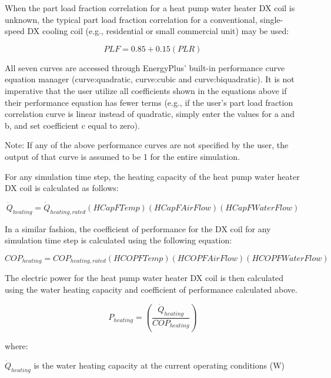 When the part load fraction correlation for a heat pump water heater DX coil is unknown, the typical part load fraction correlation for a conventional, single-speed DX cooling coil (e.g., residential or small commercial unit) may be used:

\begin{equation}
PLF = 0.85 + 0.15(PLR)
\end{equation}

All seven curves are accessed through EnergyPlus' built-in performance curve equation manager (curve:quadratic, curve:cubic and curve:biquadratic). It is not imperative that the user utilize all coefficients shown in the equations above if their performance equation has fewer terms (e.g., if the user's part load fraction correlation curve is linear instead of quadratic, simply enter the values for a and b, and set coefficient c equal to zero).

Note: If any of the above performance curves are not specified by the user, the output of that curve is assumed to be 1 for the entire simulation.

For any simulation time step, the heating capacity of the heat pump water heater DX coil is calculated as follows:

\begin{equation}
{\dot{Q}_{heating}} = {\dot{Q}_{heating,rated}}\left( {HCapFTemp} \right)\left( {HCapFAirFlow} \right)\left( {HCapFWaterFlow} \right)
\end{equation}

In a similar fashion, the coefficient of performance for the DX coil for any simulation time step is calculated using the following equation:

\begin{equation}
CO{P_{heating}} = CO{P_{heating,rated}}\left( {HCOPFTemp} \right)\left( {HCOPFAirFlow} \right)\left( {HCOPFWaterFlow} \right)
\end{equation}

The electric power for the heat pump water heater DX coil is then calculated using the water heating capacity and coefficient of performance calculated above.

\begin{equation}
{P_{heating}} = \left( {\frac{{{{\dot{Q}}_{heating}}}}{{CO{P_{heating}}}}} \right)
\end{equation}

where:

\({\dot{Q}_{heating}}\) is the water heating capacity at the current operating conditions (W)

